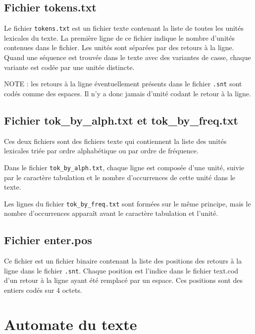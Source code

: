 \subsection{Fichier tokens.txt}
Le fichier \verb+tokens.txt+ est un fichier texte contenant la liste de toutes les unités lexicales
du texte. La première ligne de ce fichier indique le nombre d’unités contenues dans le fichier.
Les unités sont séparées par des retours à la ligne. Quand une séquence est trouvée dans le
texte avec des variantes de casse, chaque variante est codée par une unitée distincte.

\bigskip
\noindent NOTE : les retours à la ligne éventuellement présents dans le fichier \verb+.snt+                                                                              sont codés comme des espaces. Il n’y a donc jamais d’unité codant le retour à la ligne.


\subsection{Fichier tok\_by\_alph.txt et tok\_by\_freq.txt}
Ces deux fichiers sont des fichiers texte qui contiennent la liste des unités lexicales triée
par ordre alphabétique ou par ordre de fréquence.

\bigskip
\noindent Dans le fichier \verb+tok_by_alph.txt+, chaque ligne est composée d’une unité, suivie par
le caractère tabulation et le nombre d’occurrences de cette unité dans le texte.

\bigskip
\noindent Les lignes du fichier \verb+tok_by_freq.txt+ sont formées sur le même principe, mais le
nombre d’occurrences apparaît avant le caractère tabulation et l’unité.


\subsection{Fichier enter.pos}
Ce fichier est un fichier binaire contenant la liste des positions des retours à la ligne dans le
fichier \verb+.snt+. Chaque position est l’indice dans le fichier text.cod d’un retour à la ligne
ayant été remplacé par un espace. Ces positions sont des entiers codés sur 4 octets.





\section{Automate du texte}

